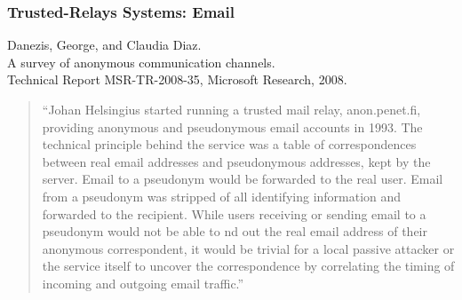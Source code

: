 \begin{frame}
  \frametitle{Trusted-Relays Systems: Email}

  \begin{block}{Danezis, George, and Claudia Diaz. \\
      A survey of anonymous communication channels. \\
      Technical Report MSR-TR-2008-35, Microsoft Research, 2008.}
  \begin{quotation}
    ``Johan Helsingius started running a trusted mail relay, anon.penet.fi,
    providing anonymous and pseudonymous email accounts in 1993.  The
    technical principle behind the service was a table of correspondences
    between real email addresses and pseudonymous addresses, kept by the
    server.  Email to a pseudonym would be forwarded to the real user.  Email
    from a pseudonym was stripped of all identifying information and forwarded
    to the recipient.  While users receiving or sending email to a pseudonym
    would not be able to nd out the real email address of their anonymous
    correspondent, it would be trivial for a local passive attacker or the
    service itself to uncover the correspondence by correlating the timing of
    incoming and outgoing email traffic.''
  \end{quotation}
  \end{block}
\end{frame}


